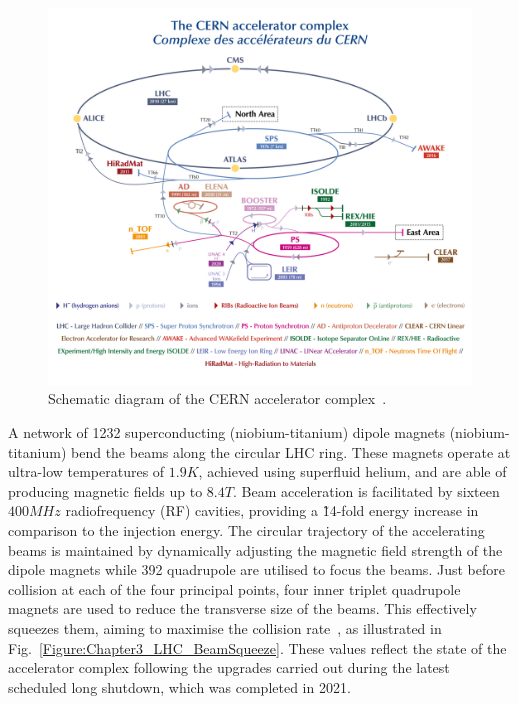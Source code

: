\begin{figure}[h]
\centering
\includegraphics[width= 1.0\textwidth]{Figures/Chapter3/LHC_AcceleratorComplex.png}
\caption{Schematic diagram of the CERN accelerator complex~\cite{LHC_InjectorComplex}.}
\label{Figure:Chapter3_LHC_Complex}
\end{figure}

A network of 1232 superconducting (niobium-titanium) dipole magnets (niobium-titanium) bend the beams along the circular LHC ring. These magnets operate at ultra-low temperatures of $1.9\unit{K}$, achieved using superfluid helium, and are able of producing magnetic fields up to $8.4\unit{T}$. Beam acceleration is facilitated by sixteen $400\unit{MHz}$ radiofrequency (RF) cavities, providing a \~14-fold energy increase in comparison to the injection energy. The circular trajectory of the accelerating beams is maintained by dynamically adjusting the magnetic field strength of the dipole magnets while 392 quadrupole are utilised to focus the beams. Just before collision at each of the four principal points, four inner triplet quadrupole magnets are used to reduce the transverse size of the beams. This effectively squeezes them, aiming to maximise the collision rate~\cite{LHC_Run3}, as illustrated in Fig.~\ref{Figure:Chapter3_LHC_BeamSqueeze}. These values reflect the state of the accelerator complex following the upgrades carried out during the latest scheduled long shutdown, which was completed in 2021.

